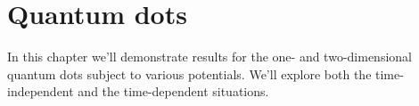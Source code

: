 \chapter{Quantum dots}
    In this chapter we'll demonstrate results for the one- and
    two-dimensional quantum dots subject to various potentials.
    We'll explore both the time-independent and the time-dependent situations.

    
    
